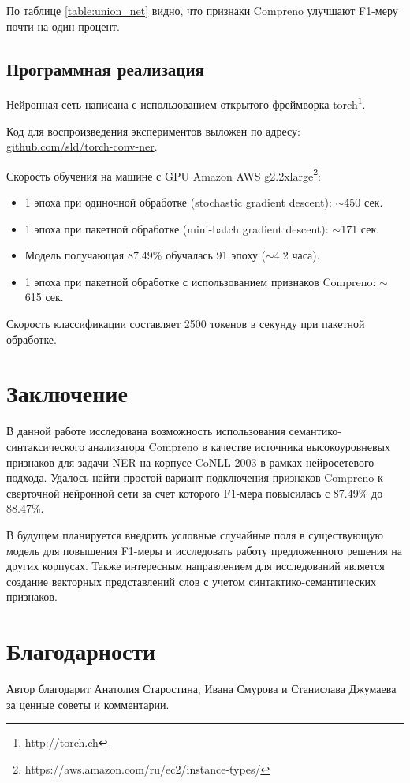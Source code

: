 \documentclass[a4paper,12pt]{article}
\begin{document}
\newpage


По таблице \ref{table:union_net} видно, что признаки Compreno улучшают F1-меру почти на один процент.

\subsection{Программная реализация}

Нейронная сеть написана с использованием открытого фреймворка torch\footnote{http://torch.ch}.

Код для воспроизведения экспериментов выложен по адресу:
\href{https://github.com/sld/torch-conv-ner}{github.com/sld/torch-conv-ner}.

Скорость обучения на машине с GPU Amazon AWS g2.2xlarge\footnote{https://aws.amazon.com/ru/ec2/instance-types/}:
\begin{itemize}
\item 1 эпоха при одиночной обработке (stochastic gradient descent): $\sim$450 сек.
\item 1 эпоха при пакетной обработке (mini-batch gradient descent): $\sim$171 сек.
\item Модель получающая 87.49\% обучалась 91 эпоху ($\sim$4.2 часа).
\item 1 эпоха при пакетной обработке с использованием признаков Compreno: $\sim$615 сек.
\end{itemize}

Скорость классификации составляет 2500 токенов в секунду при пакетной обработке.

\section{Заключение}
В данной работе исследована возможность использования семантико-синтаксического
анализатора Compreno в качестве источника высокоуровневых признаков для задачи
NER на корпусе CoNLL 2003 в рамках нейросетевого подхода.
Удалось найти простой вариант подключения признаков Compreno к сверточной нейронной
сети за счет которого F1-мера повысилась с 87.49\% до 88.47\%.

В будущем планируется внедрить условные случайные поля в существующую модель для
повышения F1-меры и исследовать работу предложенного решения на других корпусах.
Также интересным направлением для исследований является создание
векторных представлений слов с учетом синтактико-семантических признаков.


\section{Благодарности}
Автор благодарит Анатолия Старостина, Ивана Смурова и Станислава Джумаева за ценные
советы и комментарии.

\newpage


\renewcommand\refname{Список литературы}

\end{document}
